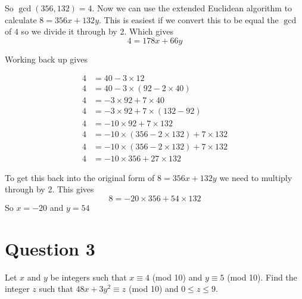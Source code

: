 \documentclass[11pt]{article}
\begin{document}
So $\gcd(356,132) = 4$. Now we can use the extended Euclidean algorithm to
calculate $8 = 356x + 132y$. This is easiest if we convert this to be equal the
$\gcd$ of $4$ so we divide it through by 2. Which gives $$4 = 178x + 66y$$

Working back up gives

\begin{align*}
	4 &= 40 - 3 \times 12 \\
	4 &= 40 - 3 \times (92 - 2 \times 40) \\
	4 &= -3 \times 92 + 7 \times 40 \\
	4 &= -3 \times 92 + 7 \times (132 - 92) \\
	4 &= -10 \times 92 + 7 \times 132 \\
	4 &= -10 \times (356 - 2 \times 132) + 7 \times 132 \\
	4 &= -10 \times (356 - 2 \times 132) + 7 \times 132 \\
	4 &= -10 \times 356 + 27 \times 132
\end{align*}

To get this back into the original form of $8 = 356x + 132y$ we need to
multiply through by 2. This gives $$8 = -20 \times 356 + 54 \times 132$$
So $x = -20$ and $y = 54$


\section*{Question 3}
Let $x$ and $y$ be integers such that $x \equiv 4$ (mod 10) and $y \equiv 5$
(mod 10).  Find the integer $z$ such that $48x + 3y^2 \equiv z$ (mod 10) and $0
\leq z \leq 9$.

\end{document}
